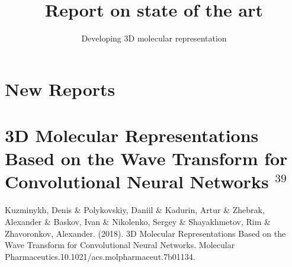 \documentclass[]{report}
\title{Report on state of the art}
\author{Developing 3D molecular representation}
\begin{document}
\maketitle
\section{New Reports}



\section{3D Molecular Representations Based on the Wave Transform for Convolutional Neural Networks $^{39}$}
Kuzminykh, Denis \& Polykovskiy, Daniil \& Kadurin, Artur \& Zhebrak, Alexander \& Baskov, Ivan \& Nikolenko, Sergey \& Shayakhmetov, Rim \& Zhavoronkov, Alexander. (2018). 3D Molecular Representations Based on the Wave Transform for Convolutional Neural Networks. Molecular Pharmaceutics.10.1021/acs.molpharmaceut.7b01134. 
\end{document}
